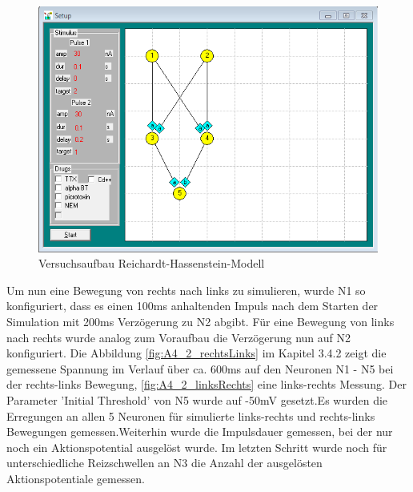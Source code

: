\documentclass[a4paper]{article}
\begin{document}
\vspace{1.0\baselineskip}
\begin{figure}[H]
    \centering
    \includegraphics[scale=0.6]{images/Aufgabe4_2_Aufbau.png}
    \caption{Versuchsaufbau Reichardt-Hassenstein-Modell}
    \label{fig:A4_2_Aufbau}
\end{figure}

\noindent Um nun eine Bewegung von rechts nach links zu simulieren, wurde N1 so konfiguriert, dass es einen 100ms anhaltenden Impuls nach dem Starten der Simulation mit 200ms Verzögerung zu N2 abgibt. Für eine Bewegung von links nach rechts wurde analog zum Voraufbau die Verzögerung nun auf N2 konfiguriert.
Die Abbildung \ref{fig:A4_2_rechtsLinks} im Kapitel 3.4.2 zeigt die gemessene Spannung im Verlauf über ca. 600ms auf den Neuronen N1 - N5 bei der rechts-links Bewegung, \ref{fig:A4_2_linksRechts} eine links-rechts Messung. Der Parameter 'Initial Threshold' von N5 wurde auf -50mV gesetzt.Es wurden die Erregungen an allen 5 Neuronen für simulierte links-rechts und rechts-links Bewegungen gemessen.Weiterhin wurde die Impulsdauer gemessen, bei der nur noch ein Aktionspotential ausgelöst wurde. Im letzten Schritt wurde noch für unterschiedliche Reizschwellen an N3 die Anzahl der ausgelösten Aktionspotentiale gemessen.
\\
%

\newpage
\end{document}
